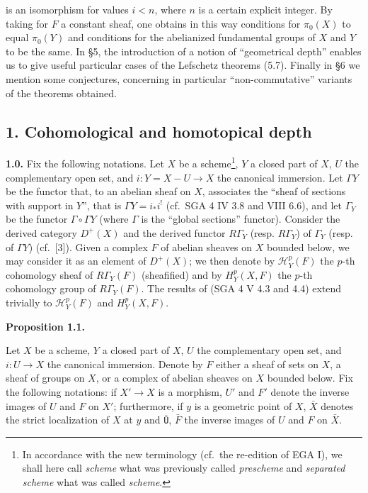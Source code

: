 \documentclass[
]{article}
\begin{document}
is an isomorphism for values \(i < n\), where \(n\) is a certain
explicit integer. By taking for \(F\) a constant sheaf, one obtains in
this way conditions for \(\pi_{0}(X)\) to equal \(\pi_{0}(Y)\) and
conditions for the abelianized fundamental groups of \(X\) and \(Y\) to
be the same. In §5, the introduction of a notion of ``geometrical
depth'' enables us to give useful particular cases of the Lefschetz
theorems (5.7). Finally in §6 we mention some conjectures, concerning in
particular ``non-commutative'' variants of the theorems obtained.

\subsection{1. Cohomological and homotopical
depth}\label{cohomological-and-homotopical-depth}

\textbf{1.0.} Fix the following notations. Let \(X\) be a
scheme\footnote{In accordance with the new terminology (cf.~the
  re-edition of EGA I), we shall here call \emph{scheme} what was
  previously called \emph{prescheme} and \emph{separated scheme} what
  was called \emph{scheme}.}, \(Y\) a closed part of \(X\), \(U\) the
complementary open set, and \(i : Y = X - U \to X\) the canonical
immersion. Let \(\Gamma Y\) be the functor that, to an abelian sheaf on
\(X\), associates the ``sheaf of sections with support in \(Y\)'', that
is \(\Gamma Y = i_{*} i^{!}\) (cf.~SGA 4 IV 3.8 and VIII 6.6), and let
\(\Gamma_{Y}\) be the functor \(\Gamma \circ \Gamma Y\) (where
\(\Gamma\) is the ``global sections'' functor). Consider the derived
category \(D^{+}(X)\) and the derived functor \(R\Gamma_{Y}\) (resp.
\(R\Gamma_{Y}\)) of \(\Gamma_{Y}\) (resp. of \(\Gamma Y\))
(cf.~{[}3{]}). Given a complex \(F\) of abelian sheaves on \(X\) bounded
below, we may consider it as an element of \(D^{+}(X)\); we then denote
by \(\mathcal{H}^{p}_{Y}(F)\) the \(p\)-th cohomology sheaf of
\(R\Gamma_{Y}(F)\) (sheafified) and by \(H^{p}_{Y}(X, F)\) the \(p\)-th
cohomology group of \(R\Gamma_{Y}(F)\). The results of (SGA 4 V 4.3 and
4.4) extend trivially to \(\mathcal{H}^{p}_{Y}(F)\) and
\(H^{p}_{Y}(X, F)\).

\textbf{Proposition 1.1.}

Let \(X\) be a scheme, \(Y\) a closed part of \(X\), \(U\) the
complementary open set, and \(i : U \to X\) the canonical immersion.
Denote by \(F\) either a sheaf of sets on \(X\), a sheaf of groups on
\(X\), or a complex of abelian sheaves on \(X\) bounded below. Fix the
following notations: if \(X' \to X\) is a morphism, \(U'\) and \(F'\)
denote the inverse images of \(U\) and \(F\) on \(X'\); furthermore, if
\(y\) is a geometric point of \(X\), \(\bar{X}\) denotes the strict
localization of \(X\) at \(y\) and \texttt{Ū}, \(\bar{F}\) the inverse
images of \(U\) and \(F\) on \(\bar{X}\).
\end{document}
